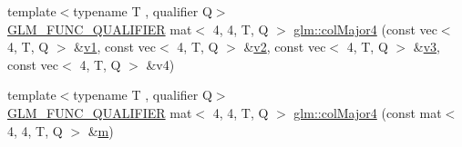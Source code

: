 \begin{DoxyCompactItemize}
\item 
{\footnotesize template$<$typename T , qualifier Q$>$ }\\\mbox{\hyperlink{setup_8hpp_a33fdea6f91c5f834105f7415e2a64407}{G\+L\+M\+\_\+\+F\+U\+N\+C\+\_\+\+Q\+U\+A\+L\+I\+F\+I\+ER}} mat$<$ 4, 4, T, Q $>$ \mbox{\hyperlink{group__gtx__matrix__major__storage_gaf4aa6c7e17bfce41a6c13bf6469fab05}{glm\+::col\+Major4}} (const vec$<$ 4, T, Q $>$ \&\mbox{\hyperlink{_s_d_l__opengl__glext_8h_a435c176a02c061b43e19bdf7c86cceae}{v1}}, const vec$<$ 4, T, Q $>$ \&\mbox{\hyperlink{_s_d_l__opengl__glext_8h_a0928f6d0f0f794ba000a21dfae422136}{v2}}, const vec$<$ 4, T, Q $>$ \&\mbox{\hyperlink{_s_d_l__opengl__glext_8h_acc806b31cbf466ceba6555983d8b814d}{v3}}, const vec$<$ 4, T, Q $>$ \&v4)
\item 
{\footnotesize template$<$typename T , qualifier Q$>$ }\\\mbox{\hyperlink{setup_8hpp_a33fdea6f91c5f834105f7415e2a64407}{G\+L\+M\+\_\+\+F\+U\+N\+C\+\_\+\+Q\+U\+A\+L\+I\+F\+I\+ER}} mat$<$ 4, 4, T, Q $>$ \mbox{\hyperlink{group__gtx__matrix__major__storage_gaf3f9511c366c20ba2e4a64c9e4cec2b3}{glm\+::col\+Major4}} (const mat$<$ 4, 4, T, Q $>$ \&\mbox{\hyperlink{_s_d_l__opengl__glext_8h_af593500c283bf1a787a6f947f503a5c2}{m}})
\end{DoxyCompactItemize}
